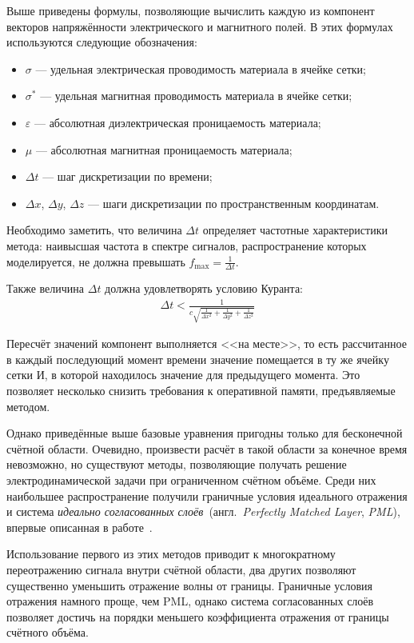 Выше приведены формулы, позволяющие вычислить каждую из компонент векторов напряжённости электрического и магнитного полей. В этих формулах используются следующие обозначения:
\begin{itemize}[label={}]
\item $ \sigma $ --- удельная электрическая проводимость материала в ячейке сетки;
\item $ \sigma^{*} $ --- удельная магнитная проводимость материала в ячейке сетки;
\item $ \varepsilon $ --- абсолютная диэлектрическая проницаемость материала;
\item $ \mu $ --- абсолютная магнитная проницаемость материала;
\item $ \Delta{t} $ --- шаг дискретизации по времени;
\item $ \Delta{x} $, $ \Delta{y} $, $ \Delta{z} $ --- шаги дискретизации по пространственным координатам.
\end{itemize}

Необходимо заметить, что величина $ \Delta{t} $ определяет частотные характеристики метода: наивысшая частота в спектре сигналов, распространение которых моделируется, не должна превышать $ f_{\text{max}} = \frac{1}{\Delta{t}} $.

Также величина $ \Delta{t} $ должна удовлетворять условию Куранта:
\begin{align*}
\Delta{t} < \frac{1}{c\sqrt{\frac{1}{\Delta{x}^2} + \frac{1}{\Delta{y}^2} + \frac{1}{\Delta{z}^2}}}
\end{align*}

Пересчёт значений компонент выполняется <<на месте>>, то есть рассчитанное в каждый последующий момент времени значение помещается в ту же ячейку сетки И, в которой находилось значение для предыдущего момента. Это позволяет несколько снизить требования к оперативной памяти, предъявляемые методом.

Однако приведённые выше базовые уравнения пригодны только для
бесконечной счётной области. Очевидно, произвести расчёт в такой области за конечное время невозможно, но существуют методы,
позволяющие получать решение электродинамической задачи при ограниченном счётном объёме. Среди них наибольшее распространение получили 
граничные условия идеального отражения и система \textit{идеально согласованных слоёв}~(англ.~\textit{Perfectly Matched Layer}, \textit{PML}), впервые описанная в работе~\cite{Berenger94}.

Использование первого из этих методов приводит к многократному переотражению
сигнала внутри счётной области, два других позволяют существенно уменьшить 
отражение волны от границы. Граничные условия отражения намного проще, чем PML, однако система согласованных слоёв позволяет достичь на порядки меньшего
коэффициента отражения от границы счётного объёма.

